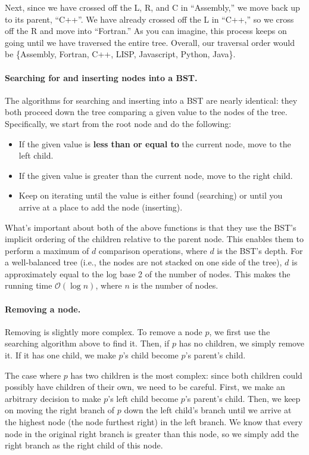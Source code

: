 \documentclass[10pt]{article}
\begin{document}
Next, since we have crossed off the L, R, and C in ``Assembly,''
we move back up to its parent, ``C++''.
We have already crossed off the L in ``C++,'' so we cross off the R and move
into ``Fortran.''
As you can imagine, this process keeps on going until we have traversed
the entire tree.
Overall, our traversal order would be \{Assembly, Fortran, C++, LISP,
Javascript, Python, Java\}.

\paragraph{Searching for and inserting nodes into a BST.}
The algorithms for searching and inserting into a BST are nearly identical:
they both proceed down the tree comparing a given value to the nodes of the tree.
Specifically, we start from the root node and do the following:
\begin{itemize}
\item If the given value is \textbf{less than or equal to} the current node, move
to the left child.
\item If the given value is greater than the current node, move to the right child.
\item Keep on iterating until the value is either found (searching) or
until you arrive at a place to add the node (inserting).
\end{itemize}

What's important about both of the above functions is that they use
the BST's implicit ordering of the children relative to the parent node.
This enables them to perform a maximum of $d$ comparison operations,
where $d$ is the BST's depth.
For a well-balanced tree (i.e., the nodes are not stacked
on one side of the tree), $d$ is approximately equal to the log base 2
of the number of nodes.
This makes the running time $\mathcal{O}(\log{}n)$, where $n$ is the number
of nodes.

\paragraph{Removing a node.}
Removing is slightly more complex.
To remove a node $p$, we first use the searching algorithm above to find it.
Then, if $p$ has no children, we simply remove it.
If it has one child, we make $p$'s child become $p$'s parent's child.

The case where $p$ has two children is the most complex:
since both children could possibly have children of their own, we need to be careful.
First, we make an arbitrary decision to make $p$'s left child become $p$'s parent's child.
Then, we keep on moving the right branch of $p$ down the left child's branch until we
arrive at the highest node (the node furthest right) in the left branch.
We know that every node in the original right branch is greater than this node,
so we simply add the right branch as the right child of this node.
\end{document}
